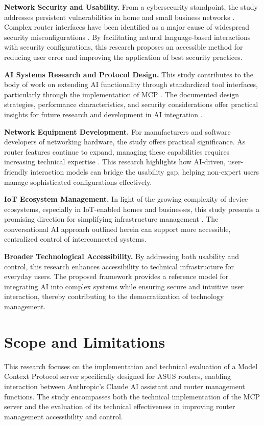 \textbf{Network Security and Usability.} From a cybersecurity standpoint, the study addresses persistent vulnerabilities in home and small business networks \cite{consumer_cybersecurity}. Complex router interfaces have been identified as a major cause of widespread security misconfigurations \cite{wifi_security_settings}. By facilitating natural language-based interactions with security configurations, this research proposes an accessible method for reducing user error and improving the application of best security practices.

\textbf{AI Systems Research and Protocol Design.} This study contributes to the body of work on extending AI functionality through standardized tool interfaces, particularly through the implementation of MCP \cite{mcp_intro}. The documented design strategies, performance characteristics, and security considerations offer practical insights for future research and development in AI integration \cite{ai_architecture_review}.

\textbf{Network Equipment Development.} For manufacturers and software developers of networking hardware, the study offers practical significance. As router features continue to expand, managing these capabilities requires increasing technical expertise \cite{router_guide}. This research highlights how AI-driven, user-friendly interaction models can bridge the usability gap, helping non-expert users manage sophisticated configurations effectively.

\textbf{IoT Ecosystem Management.} In light of the growing complexity of device ecosystems, especially in IoT-enabled homes and businesses, this study presents a promising direction for simplifying infrastructure management \cite{iot_device_management}. The conversational AI approach outlined herein can support more accessible, centralized control of interconnected systems.

\textbf{Broader Technological Accessibility.} By addressing both usability and control, this research enhances accessibility to technical infrastructure for everyday users. The proposed framework provides a reference model for integrating AI into complex systems while ensuring secure and intuitive user interaction, thereby contributing to the democratization of technology management.

\section{Scope and Limitations}
This research focuses on the implementation and technical evaluation of a Model Context Protocol server specifically designed for ASUS routers, enabling interaction between Anthropic's Claude AI assistant and router management functions. The study encompasses both the technical implementation of the MCP server and the evaluation of its technical effectiveness in improving router management accessibility and control. 

